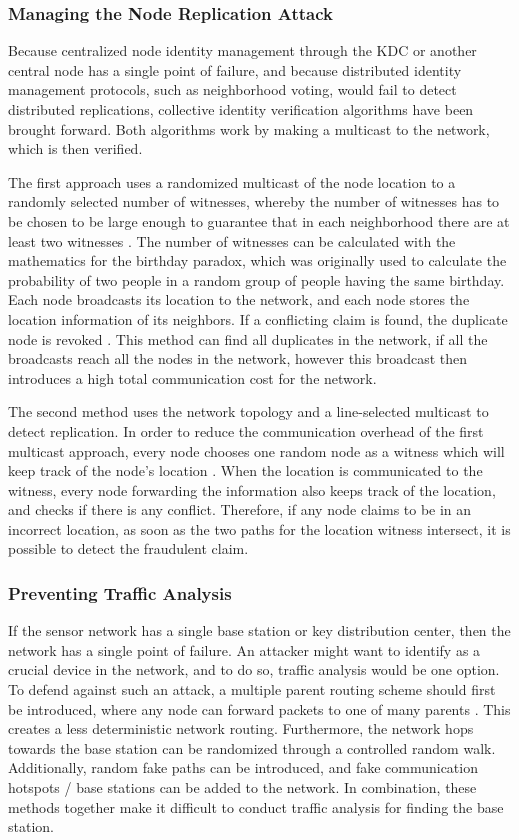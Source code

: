 \documentclass[12pt,a4paper,twoside]{report}
\begin{document}
\subsubsection{Managing the Node Replication Attack}
Because centralized node identity management through the KDC or another central node has a single point of failure, and because distributed identity management protocols, such as neighborhood voting, would fail to detect distributed replications, collective identity verification algorithms have been brought forward. Both algorithms work by making a multicast to the network, which is then verified.\par
The first approach uses a randomized multicast of the node location to a randomly selected number of witnesses, whereby the number of  witnesses has to be chosen to be large enough to guarantee that in each neighborhood there are at least two witnesses \cite{sen:2009}. The number of witnesses can be calculated with the mathematics for the birthday paradox, which was originally used to calculate the probability of two people in a random group of people having the same birthday. Each node broadcasts its location to the network, and each node stores the location information of its neighbors. If a conflicting claim is found, the duplicate node is revoked \cite{sen:2009}. This method can find all duplicates in the network, if all the broadcasts reach all the nodes in the network, however this broadcast then introduces a high total communication cost for the network.\par
The second method uses the network topology and a line-selected multicast to detect replication. In order to reduce the communication overhead of the first multicast approach, every node chooses one random node as a witness which will keep track of the node's location \cite{sen:2009}. When the location is communicated to the witness, every node forwarding the information also keeps track of the location, and checks if there is any conflict. Therefore, if any node claims to be in an incorrect location,  as soon as the two paths for the location witness intersect, it is possible to detect the fraudulent claim.\par
\subsubsection{Preventing Traffic Analysis}
If the sensor network has a single base station or key distribution center, then the network has a single point of failure. An attacker might want to identify as a crucial device in the network, and to do so, traffic analysis would be one option. To defend against such an attack, a multiple parent routing scheme should first be introduced, where any node can forward packets to one of many parents \cite{sen:2009}. This creates a less deterministic network routing. Furthermore, the network hops towards the base station can be randomized through a controlled random walk. Additionally, random fake paths can be introduced, and fake communication hotspots / base stations can be added to the network. In combination, these methods together make it difficult to conduct traffic analysis for finding the base station.\par
\end{document}
